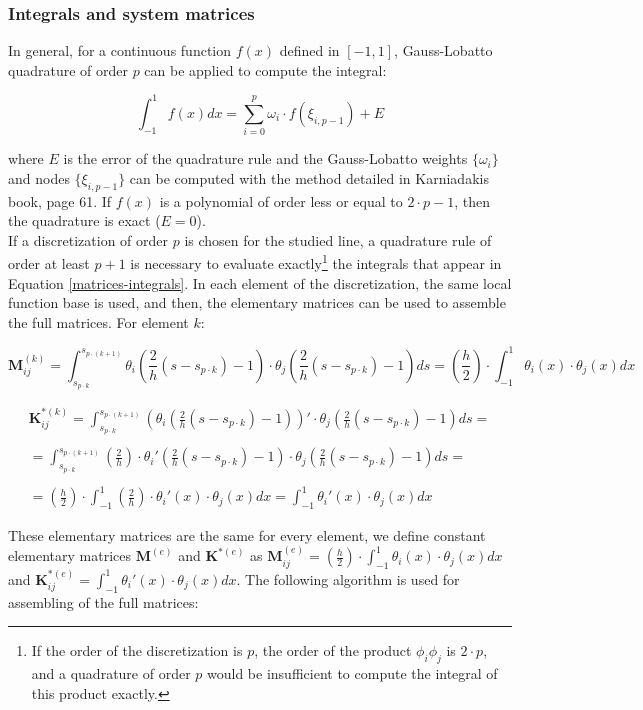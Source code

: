 \documentclass[10pt] {article}
\newcommand{\ba}{\begin{array}}
\newcommand{\ea}{\end{array}}
\begin{document}
\subsubsection{Integrals and system matrices}

In general, for a continuous function $f(x)$ defined in $[-1,1]$, Gauss-Lobatto quadrature of order $p$ can be applied to compute the integral:

$$\int_{-1}^{1} f(x) dx = \sum_{i=0}^{p}\omega_i\cdot f(\xi_{i,p-1}) + E$$

where $E$ is the error of the quadrature rule and the Gauss-Lobatto weights $\{\omega_i\}$ and nodes $\{\xi_{i,p-1}\}$ can be computed with the method detailed in Karniadakis \cite{karniadakis} book, page 61. If $f(x)$ is a polynomial of order less or equal to $2\cdot p-1$, then the quadrature is exact ($E=0$).\\

If a discretization of order $p$ is chosen for the studied line, a quadrature rule of order at least $p+1$ is necessary to evaluate exactly\footnote{If the order of the discretization is $p$, the order of the product $\phi_i\phi_j$ is $2\cdot p$, and a quadrature of order $p$ would be insufficient to compute the integral of this product exactly.} the integrals that appear in Equation \ref{matrices-integrals}. In each element of the discretization, the same local function base is used, and then, the elementary matrices can be used to assemble the full matrices. For element $k$:

$$\mathbf{M}_{ij}^{(k)} = \int_{s_{p\cdot k}}^{s_{p\cdot (k+1)}} \theta_i(\frac{2}{h}(s-s_{p\cdot k})-1) \cdot\theta_j(\frac{2}{h}(s-s_{p\cdot k})-1)ds = \left(\frac{h}{2}\right)\cdot\int_{-1}^{1} \theta_i(x)\cdot\theta_j(x) dx $$

$$\ba{r} \mathbf{K}_{ij}^{*(k)} = \int_{s_{p\cdot k}}^{s_{p\cdot (k+1)}} \left(\theta_i(\frac{2}{h}(s-s_{p\cdot k})-1)\right) ' \cdot\theta_j(\frac{2}{h}(s-s_{p\cdot k})-1)ds = \\
\\
=\int_{s_{p\cdot k}}^{s_{p\cdot (k+1)}} \left(\frac{2}{h}\right)\cdot\theta_i'(\frac{2}{h}(s-s_{p\cdot k})-1) \cdot\theta_j(\frac{2}{h}(s-s_{p\cdot k})-1)ds = \\
\\
=\left(\frac{h}{2}\right)\cdot\int_{-1}^{1} \left(\frac{2}{h}\right)\cdot\theta_i'(x)\cdot\theta_j(x) dx = \int_{-1}^{1} \theta_i'(x)\cdot\theta_j(x) dx \ea$$


These elementary matrices are the same for every element, we define constant elementary matrices $\mathbf{M}^{(e)}$ and $\mathbf{K}^{*(e)}$ as $\mathbf{M}_{ij}^{(e)} = \left(\frac{h}{2}\right)\cdot\int_{-1}^{1} \theta_i(x)\cdot\theta_j(x) dx$ and $\mathbf{K}_{ij}^{*(e)} = \int_{-1}^{1} \theta_i'(x)\cdot\theta_j(x) dx$. The following algorithm is used for assembling of the full matrices:
\end{document}
